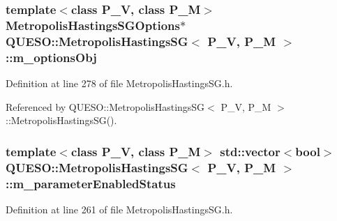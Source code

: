 \hypertarget{class_q_u_e_s_o_1_1_metropolis_hastings_s_g_a5d0bc9f73d50d272aa6bfb5ef5939ef3}{
\subsubsection[{m\-\_\-options\-Obj}]{\setlength{\rightskip}{0pt plus 5cm}template$<$class P\-\_\-\-V, class P\-\_\-\-M$>$ {\bf Metropolis\-Hastings\-S\-G\-Options}$\ast$ {\bf Q\-U\-E\-S\-O\-::\-Metropolis\-Hastings\-S\-G}$<$ P\-\_\-\-V, P\-\_\-\-M $>$\-::m\-\_\-options\-Obj\hspace{0.3cm}{\ttfamily [private]}}}\label{class_q_u_e_s_o_1_1_metropolis_hastings_s_g_a5d0bc9f73d50d272aa6bfb5ef5939ef3}


Definition at line 278 of file Metropolis\-Hastings\-S\-G.\-h.



Referenced by Q\-U\-E\-S\-O\-::\-Metropolis\-Hastings\-S\-G$<$ P\-\_\-\-V, P\-\_\-\-M $>$\-::\-Metropolis\-Hastings\-S\-G().

\hypertarget{class_q_u_e_s_o_1_1_metropolis_hastings_s_g_afce8eeadae98935c72727b3640e88a31}{
\subsubsection[{m\-\_\-parameter\-Enabled\-Status}]{\setlength{\rightskip}{0pt plus 5cm}template$<$class P\-\_\-\-V, class P\-\_\-\-M$>$ std\-::vector$<$bool$>$ {\bf Q\-U\-E\-S\-O\-::\-Metropolis\-Hastings\-S\-G}$<$ P\-\_\-\-V, P\-\_\-\-M $>$\-::m\-\_\-parameter\-Enabled\-Status\hspace{0.3cm}{\ttfamily [private]}}}\label{class_q_u_e_s_o_1_1_metropolis_hastings_s_g_afce8eeadae98935c72727b3640e88a31}


Definition at line 261 of file Metropolis\-Hastings\-S\-G.\-h.

